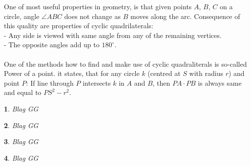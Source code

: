 \documentclass[12pt]{article}
\newtheorem{problem}{}
\begin{document}
One of most useful properties in geometry, is that given points $A$, $B$, $C$ on a circle, angle $\angle ABC$ does not change as $B$ moves along the arc. Consequence of this quality are properties of cyclic quadrilaterals:\\
- Any side is viewed with same angle from any of the remaining vertices.\\
- The opposite angles add up to $180^\circ$.\\
\\One of the methods how to find and make use of cyclic quadraliterals is so-called Power of a point. it states, that for any circle $k$ (centred at $S$ with radius $r$) and point $P$: If line through $P$ intersects $k$ in $A$ and $B$, then $PA \cdot PB$ is always same and equal to $PS^2 - r^2$.

\begin{problem}
Blag GG
\end{problem}

\begin{problem}
Blag GG
\end{problem}

\begin{problem}
Blag GG
\end{problem}

\begin{problem}
Blag GG
\end{problem}
\end{document}
